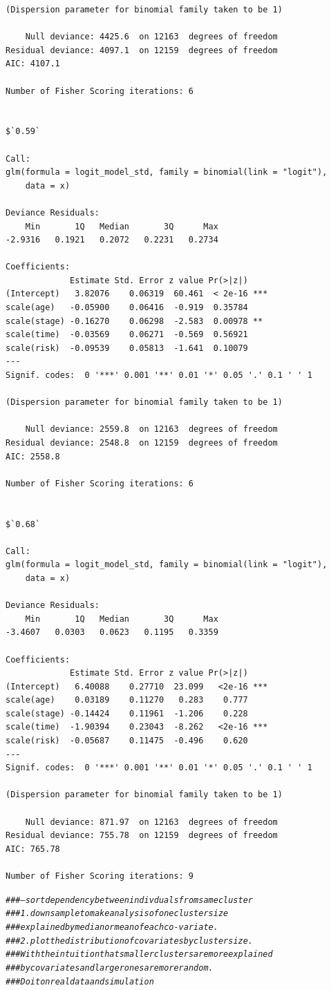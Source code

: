 \documentclass[]{revtex4}\usepackage[]{graphicx}\usepackage[]{color}
\makeatletter
\newcommand{\hlcom}[1]{\textcolor[rgb]{0.678,0.584,0.686}{\textit{#1}}}%
\newenvironment{kframe}{%
 \def\at@end@of@kframe{}%
 \ifinner\ifhmode%
  \def\at@end@of@kframe{\end{minipage}}%
  \begin{minipage}{\columnwidth}%
 \fi\fi%
 \def\FrameCommand##1{\hskip\@totalleftmargin \hskip-\fboxsep
 \colorbox{shadecolor}{##1}\hskip-\fboxsep
     \hskip-\linewidth \hskip-\@totalleftmargin \hskip\columnwidth}%
 \MakeFramed {\advance\hsize-\width
   \@totalleftmargin\z@ \linewidth\hsize
   \@setminipage}}%
 {\par\unskip\endMakeFramed%
 \at@end@of@kframe}
\newenvironment{knitrout}{}{} %
\makeatother
\begin{document}
\begin{knitrout}
\begin{kframe}
\begin{verbatim}
(Dispersion parameter for binomial family taken to be 1)

    Null deviance: 4425.6  on 12163  degrees of freedom
Residual deviance: 4097.1  on 12159  degrees of freedom
AIC: 4107.1

Number of Fisher Scoring iterations: 6


$`0.59`

Call:
glm(formula = logit_model_std, family = binomial(link = "logit"), 
    data = x)

Deviance Residuals: 
    Min       1Q   Median       3Q      Max  
-2.9316   0.1921   0.2072   0.2231   0.2734  

Coefficients:
             Estimate Std. Error z value Pr(>|z|)    
(Intercept)   3.82076    0.06319  60.461  < 2e-16 ***
scale(age)   -0.05900    0.06416  -0.919  0.35784    
scale(stage) -0.16270    0.06298  -2.583  0.00978 ** 
scale(time)  -0.03569    0.06271  -0.569  0.56921    
scale(risk)  -0.09539    0.05813  -1.641  0.10079    
---
Signif. codes:  0 '***' 0.001 '**' 0.01 '*' 0.05 '.' 0.1 ' ' 1

(Dispersion parameter for binomial family taken to be 1)

    Null deviance: 2559.8  on 12163  degrees of freedom
Residual deviance: 2548.8  on 12159  degrees of freedom
AIC: 2558.8

Number of Fisher Scoring iterations: 6


$`0.68`

Call:
glm(formula = logit_model_std, family = binomial(link = "logit"), 
    data = x)

Deviance Residuals: 
    Min       1Q   Median       3Q      Max  
-3.4607   0.0303   0.0623   0.1195   0.3359  

Coefficients:
             Estimate Std. Error z value Pr(>|z|)    
(Intercept)   6.40088    0.27710  23.099   <2e-16 ***
scale(age)    0.03189    0.11270   0.283    0.777    
scale(stage) -0.14424    0.11961  -1.206    0.228    
scale(time)  -1.90394    0.23043  -8.262   <2e-16 ***
scale(risk)  -0.05687    0.11475  -0.496    0.620    
---
Signif. codes:  0 '***' 0.001 '**' 0.01 '*' 0.05 '.' 0.1 ' ' 1

(Dispersion parameter for binomial family taken to be 1)

    Null deviance: 871.97  on 12163  degrees of freedom
Residual deviance: 755.78  on 12159  degrees of freedom
AIC: 765.78

Number of Fisher Scoring iterations: 9
\end{verbatim}
\begin{alltt}
\hlcom{###--- sort dependency between indivduals from same cluster}
\hlcom{### 1. downsample to make analysis of one cluster size}
\hlcom{###  explained by median or mean of each co-variate.}
\hlcom{###  2. plot the distribution of covariates by cluster size. }
\hlcom{###  With the intuition that smaller clusters are more explained}
\hlcom{###  by covariates and larger ones are more random. }
\hlcom{###  Do it on real data and simulation}


\end{alltt}
\end{kframe}
\end{knitrout}
\end{document}
